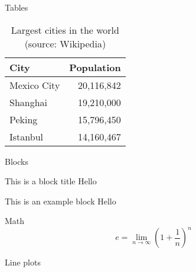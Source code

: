 \documentclass[aspectratio=169]{beamer}
\begin{document}
\begin{frame}{Tables}
  \begin{table}
    \caption{Largest cities in the world (source: Wikipedia)}
    \begin{tabular}{lr}
      \toprule
      City & Population\\
      \midrule
      Mexico City & 20,116,842\\
      Shanghai & 19,210,000\\
      Peking & 15,796,450\\
      Istanbul & 14,160,467\\
      \bottomrule
    \end{tabular}
  \end{table}
\end{frame}
\begin{frame}{Blocks}

  \begin{block}{This is a block title}
    Hello
  \end{block}

  \begin{exampleblock}{This is an example block}
    Hello
  \end{exampleblock}


  
\end{frame}
\begin{frame}{Math}
  \begin{equation*}
    e = \lim_{n\to \infty} \left(1 + \frac{1}{n}\right)^n
  \end{equation*}
\end{frame}

\begin{frame}{Line plots}
\begin{center}
\end{center}


\end{frame}
\end{document}

